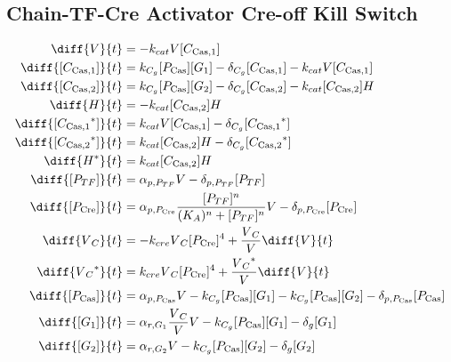 \subsection{Chain-TF-Cre Activator Cre-off Kill Switch}
\label{s:Chain_TF_Cre_Activator_Cre_off_Kill_Switch}

\begin{align}
\diff{\vectorGen{}}{t} & = - \casCutRate{{}}\vectorGen{}\conc{\cplx{\cas}{1}}\\
\diff{\conc{\cplx{\cas}{1}}}{t} & =  \gRnaBind{}\conc{\proSp{\cas{}}}\conc{\gRna{1}} - \casCompDegradeRate{}\conc{\cplx{\cas}{1}} - \casCutRate{{}}\vectorGen{}\conc{\cplx{\cas}{1}}\\
\diff{\conc{\cplx{\cas}{2}}}{t} & =  \gRnaBind{}\conc{\proSp{\cas{}}}\conc{\gRna{2}} - \casCompDegradeRate{}\conc{\cplx{\cas}{2}} - \casCutRate{{}}\conc{\cplx{\cas}{2}}\hostGen{}\\
\diff{\hostGen{}}{t} & = - \casCutRate{{}}\conc{\cplx{\cas}{2}}\hostGen{}\\
\diff{\conc{\bound{\cplx{\cas}{1}}}}{t} & =  \casCutRate{{}}\vectorGen{}\conc{\cplx{\cas}{1}} - \casCompDegradeRate{}\conc{\bound{\cplx{\cas}{1}}}\\
\diff{\conc{\bound{\cplx{\cas}{2}}}}{t} & =  \casCutRate{{}}\conc{\cplx{\cas}{2}}\hostGen{} - \casCompDegradeRate{}\conc{\bound{\cplx{\cas}{2}}}\\
\diff{\edited{\hostGen{}}}{t} & =  \casCutRate{{}}\conc{\cplx{\cas}{2}}\hostGen{}\\
\diff{\conc{\proSp{TF}}}{t} & =  \txtlRate{\proSp{TF}}\vectorGen{} - \proDegradeRate{\proSp{TF}}\conc{\proSp{TF}}\\
\diff{\conc{\proSp{\cre{}}}}{t} & =  \txtlRate{\proSp{\cre{}}}\frac{\conc{\proSp{TF}}^n}{(K_A)^n + \conc{\proSp{TF}}^n}\vectorGen{} - \proDegradeRate{\proSp{\cre{}}}\conc{\proSp{\cre{}}}\\
\diff{\vectorGen{}_C}{t} & = - \creCutRate{} \vectorGen{}_C \conc{\proSp{\cre{}}}^4 + \frac{\vectorGen{}_C}{\vectorGen{}} \diff{\vectorGen{}}{t}\\
\diff{\edited{\vectorGen{}_C}}{t} & =  \creCutRate{} \vectorGen{}_C \conc{\proSp{\cre{}}}^4 + \frac{\edited{\vectorGen{}_C}}{\vectorGen{}} \diff{\vectorGen{}}{t}\\
\diff{\conc{\proSp{\cas{}}}}{t} & =  \txtlRate{\proSp{\cas{}}}\vectorGen{} - \gRnaBind{}\conc{\proSp{\cas{}}}\conc{\gRna{1}} - \gRnaBind{}\conc{\proSp{\cas{}}}\conc{\gRna{2}} - \proDegradeRate{\proSp{\cas{}}}\conc{\proSp{\cas{}}}\\
\diff{\conc{\gRna{1}}}{t} & =  \txRate{\gRna{1}}\frac{\vectorGen{}_C}{\vectorGen{}}\vectorGen{} - \gRnaBind{}\conc{\proSp{\cas{}}}\conc{\gRna{1}} - \rnaDegradeRate{}\conc{\gRna{1}}\\
\diff{\conc{\gRna{2}}}{t} & =  \txRate{\gRna{2}}\vectorGen{} - \gRnaBind{}\conc{\proSp{\cas{}}}\conc{\gRna{2}} - \rnaDegradeRate{}\conc{\gRna{2}}
\end{align}

